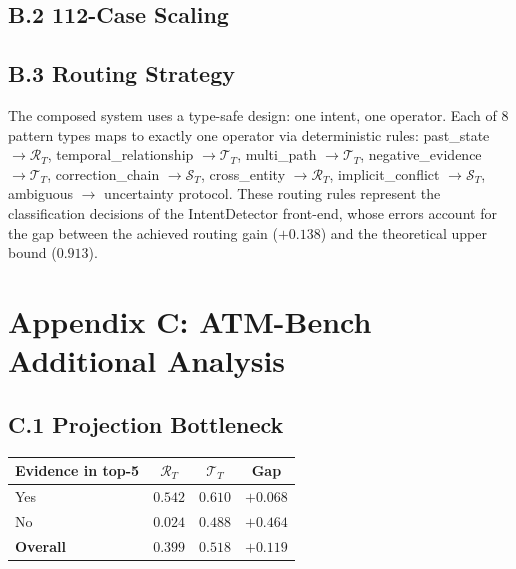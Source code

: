 \documentclass[letterpaper,twocolumn,10pt]{article}
\begin{document}
\subsection*{B.2 112-Case Scaling}
\begin{table}[h]
\centering
{}
\end{table}

\subsection*{B.3 Routing Strategy}
The composed system uses a type-safe design: one intent, one operator. Each of 8 pattern types maps to exactly one operator via deterministic rules: past\_state $\rightarrow \mathcal{R}_T$, temporal\_relationship $\rightarrow \mathcal{T}_T$, multi\_path $\rightarrow \mathcal{T}_T$, negative\_evidence $\rightarrow \mathcal{T}_T$, correction\_chain $\rightarrow \mathcal{S}_T$, cross\_entity $\rightarrow \mathcal{R}_T$, implicit\_conflict $\rightarrow \mathcal{S}_T$, ambiguous $\rightarrow$ uncertainty protocol. These routing rules represent the classification decisions of the IntentDetector front-end, whose errors account for the gap between the achieved routing gain ($+0.138$) and the theoretical upper bound ($0.913$).

\section*{Appendix C: ATM-Bench Additional Analysis}
\subsection*{C.1 Projection Bottleneck}
\begin{table}[h]
\centering\footnotesize
\begin{tabular}{lccc}
\toprule
Evidence in top-5 & $\mathcal{R}_T$ & $\mathcal{T}_T$ & Gap\\
\midrule
Yes & $0.542$ & $0.610$ & $+0.068$\\
No & $0.024$ & $0.488$ & $+0.464$\\
\textbf{Overall} & $\mathbf{0.399}$ & $\mathbf{0.518}$ & $\mathbf{+0.119}$\\%
\bottomrule
\end{tabular}
\end{table}
\end{document}
